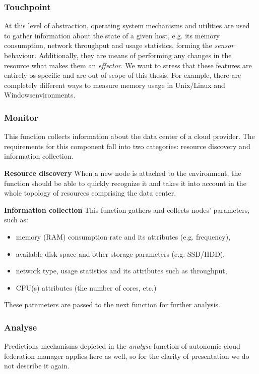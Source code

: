 \subsubsection*{Touchpoint}
At this level of abstraction, operating system mechanisms and utilities are used to gather information about the state of a given host, e.g. its memory consumption, network throughput and usage statistics, forming the \emph{sensor} behaviour.  Additionally, they are means of performing any changes in the resource what makes them an \emph{effector}.  We want to stress that these features are entirely os-specific and are out of scope of this thesis. For example, there are completely different ways to measure memory usage in Unix/Linux and Windows\texttrademark    environments.

\subsubsection{Monitor}
This function collects information about the data center of a cloud provider. The requirements for this component fall into two categories: resource discovery and information collection.

\begin{asparaenum}
\item[\textbf{Resource discovery}] When a new node is attached to the environment, the function should be able to quickly recognize it and takes it into account in the whole topology of resources comprising the data center.
\item[\textbf{Information collection}] This function gathers and collects nodes' parameters, such as:
  \begin{itemize}
    \item memory (RAM) consumption rate and its attributes (e.g. frequency),
    \item available disk space and other storage parameters (e.g. SSD/HDD),
    \item network type, usage statistics and its attributes such as throughput,
    \item CPU(s) attributes (the number of cores, etc.)
  \end{itemize}
  These parameters are passed to the next function for further analysis.
\end{asparaenum}

\subsubsection{Analyse}
Predictions mechanisms depicted in the \emph{analyse} function of autonomic cloud federation manager applies here as well, so for the clarity of presentation we do not describe it again.

